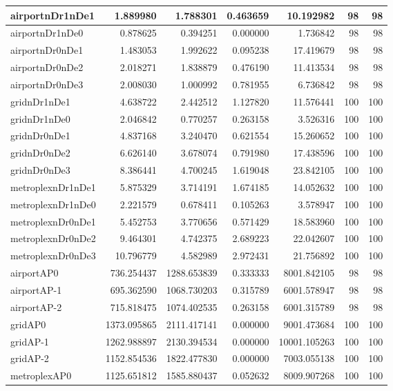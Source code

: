 \begin{longtable}{|l|r|r|r|r|r|r|}
\endlastfoot
airportnDr1nDe1 & 1.889980 & 1.788301 & 0.463659 & 10.192982 & 98 & 98 \\ \hline
airportnDr1nDe0 & 0.878625 & 0.394251 & 0.000000 & 1.736842 & 98 & 98 \\ \hline
airportnDr0nDe1 & 1.483053 & 1.992622 & 0.095238 & 17.419679 & 98 & 98 \\ \hline
airportnDr0nDe2 & 2.018271 & 1.838879 & 0.476190 & 11.413534 & 98 & 98 \\ \hline
airportnDr0nDe3 & 2.008030 & 1.000992 & 0.781955 & 6.736842 & 98 & 98 \\ \hline
gridnDr1nDe1 & 4.638722 & 2.442512 & 1.127820 & 11.576441 & 100 & 100 \\ \hline
gridnDr1nDe0 & 2.046842 & 0.770257 & 0.263158 & 3.526316 & 100 & 100 \\ \hline
gridnDr0nDe1 & 4.837168 & 3.240470 & 0.621554 & 15.260652 & 100 & 100 \\ \hline
gridnDr0nDe2 & 6.626140 & 3.678074 & 0.791980 & 17.438596 & 100 & 100 \\ \hline
gridnDr0nDe3 & 8.386441 & 4.700245 & 1.619048 & 23.842105 & 100 & 100 \\ \hline
metroplexnDr1nDe1 & 5.875329 & 3.714191 & 1.674185 & 14.052632 & 100 & 100 \\ \hline
metroplexnDr1nDe0 & 2.221579 & 0.678411 & 0.105263 & 3.578947 & 100 & 100 \\ \hline
metroplexnDr0nDe1 & 5.452753 & 3.770656 & 0.571429 & 18.583960 & 100 & 100 \\ \hline
metroplexnDr0nDe2 & 9.464301 & 4.742375 & 2.689223 & 22.042607 & 100 & 100 \\ \hline
metroplexnDr0nDe3 & 10.796779 & 4.582989 & 2.972431 & 21.756892 & 100 & 100 \\ \hline
airportAP0 & 736.254437 & 1288.653839 & 0.333333 & 8001.842105 & 98 & 98 \\ \hline
airportAP-1 & 695.362590 & 1068.730203 & 0.315789 & 6001.578947 & 98 & 98 \\ \hline
airportAP-2 & 715.818475 & 1074.402535 & 0.263158 & 6001.315789 & 98 & 98 \\ \hline
gridAP0 & 1373.095865 & 2111.417141 & 0.000000 & 9001.473684 & 100 & 100 \\ \hline
gridAP-1 & 1262.988897 & 2130.394534 & 0.000000 & 10001.105263 & 100 & 100 \\ \hline
gridAP-2 & 1152.854536 & 1822.477830 & 0.000000 & 7003.055138 & 100 & 100 \\ \hline
metroplexAP0 & 1125.651812 & 1585.880437 & 0.052632 & 8009.907268 & 100 & 100 \\ \hline

\end{longtable}
